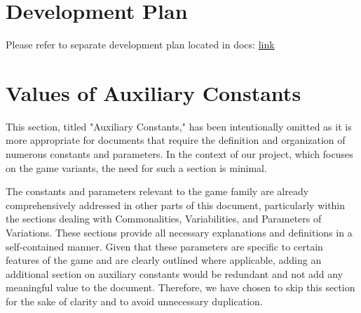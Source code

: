 \section{Development Plan}

Please refer to separate development plan located in docs: \href{https://github.com/John-Popovici/duel-of-the-eights/blob/main/docs/DevelopmentPlan/DevelopmentPlan.pdf}{link}

\section{Values of Auxiliary Constants}

This section, titled "Auxiliary Constants," has been intentionally omitted as it is more appropriate for documents that require the definition and organization of numerous constants and parameters. In the context of our project, which focuses on the game variants, the need for such a section is minimal.

The constants and parameters relevant to the game family are already comprehensively addressed in other parts of this document, particularly within the sections dealing with Commonalities, Variabilities, and Parameters of Variations. These sections provide all necessary explanations and definitions in a self-contained manner. Given that these parameters are specific to certain features of the game and are clearly outlined where applicable, adding an additional section on auxiliary constants would be redundant and not add any meaningful value to the document. Therefore, we have chosen to skip this section for the sake of clarity and to avoid unnecessary duplication.



